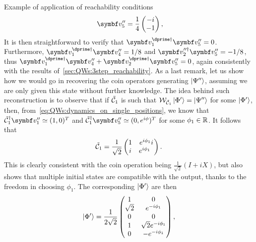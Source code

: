 \begin{examplebox}[label=ex:QWs:conditions_few_steps]{Example of application of reachability conditions}
\begin{equation}
\begin{aligned}
        \,\,
        \bs v''_5 = \frac{1}{4}\begin{pmatrix} -i \\ -1 \end{pmatrix},
    \end{aligned}
    \end{equation}
    It is then straightforward to verify that
    $\bs v_1^{\dprime\dagger}\bs v_5'' = 0$.
    Furthermore,
    $\bs v_1^{\dprime\dagger}\bs v_4'' = 1/8$
    and $\bs v_2^{\prime\prime\dagger}\bs v_5'' = -1/8$,
    thus 
    $\bs v_1^{\dprime\dagger}\bs v_4'' + \bs v_2^{\dprime\dagger}\bs v_5'' = 0$,
    again consistently with the results of~\cref{sec:QWs:3step_reachability}.
    As a last remark, let us show how we would go in recovering the coin operators generating $\ket{\Psi''}$, assuming we are only given this state without further knowledge.
    The idea behind such reconstruction is to observe that if $\tilde{{\mathcal{C}}}_1$ is such that ${\mathcal{W}}_{\tilde{{\mathcal{C}}}_1}\ket{\Phi'}=\ket{\Psi''}$ for some $\ket{\Phi'}$, then, from~\cref{eq:QWs:dynamics_on_single_positions}, we know that $\tilde\calC_1^\dagger \bs v_1''\simeq(1,0)^T$ and $\tilde\calC_1^\dagger \bs v_5''\simeq(0,e^{i\phi})^T$ for some $\phi_1\in{\mathbb{R}}$. It follows that
    \begin{equation}
        \tilde{{\mathcal{C}}}_1 =
        \frac{1}{\sqrt2} \begin{pmatrix}
            1 & e^{i\phi_1}i \\
            i & e^{i\phi_1}\phantom{1}
        \end{pmatrix}.
    \end{equation}
    This is clearly consistent with the coin operation being $\frac{1}{\sqrt2}(I+iX)$, but also shows that multiple initial states are compatible with the output, thanks to the freedom in choosing $\phi_1$. The corresponding $\ket{\Phi'}$ are then
    \begin{equation}
        \ket{\Phi'} = \frac{1}{2\sqrt2}
        \begin{pmatrix}
            1 & 0 \\
            \sqrt2 & e^{-i\phi_1} \\
            0 & 0 \\
            1 & \sqrt2 e^{-i\phi_1} \\
            0 & -e^{-i\phi_1}
        \end{pmatrix},

\end{equation}
\end{examplebox}
